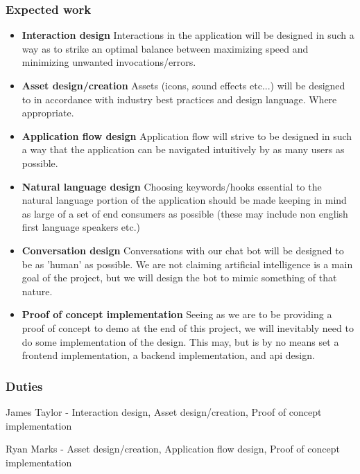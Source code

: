 \documentclass{sigchi}
\begin{document}
\subsubsection{Expected work}
\begin{itemize}
\item{\textbf{Interaction design}}
Interactions in the application will be designed in such a way as to strike an optimal balance between maximizing speed and minimizing unwanted invocations/errors.

\item{\textbf{Asset design/creation}}
Assets (icons, sound effects etc...) will be designed to in accordance with industry best practices and design language. Where appropriate.

\item{\textbf{Application flow design}}
Application flow will strive to be designed in such a way that the application can be navigated intuitively by as many users as possible.

\item{\textbf{Natural language design}}
Choosing keywords/hooks essential to the natural language portion of the application should be made keeping in mind as large of a set of end consumers as possible (these may include non english first language speakers etc.)

\item{\textbf{Conversation design}}
Conversations with our chat bot will be designed to be as 'human' as possible. We are not claiming artificial intelligence is a main goal of the project, but we will design the bot to mimic something of that nature.

\item{\textbf{Proof of concept implementation}}
Seeing as we are to be providing a proof of concept to demo at the end of this project, we will inevitably need to do some implementation of the design. This may, but is by no means set a frontend implementation, a backend implementation, and api design.

\end{itemize}
\subsubsection{Duties}

James Taylor - Interaction design, Asset design/creation, Proof of concept implementation

Ryan Marks - Asset design/creation, Application flow design, Proof of concept implementation
\end{document}
